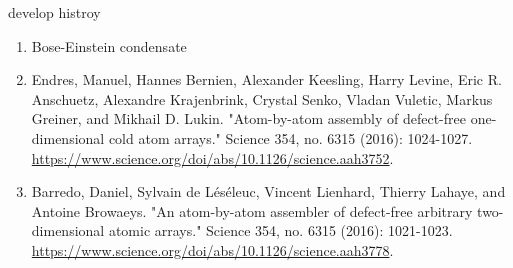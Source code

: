 \documentclass[18 pt]{beamer}
\begin{document}
\begin{frame}{develop histroy}
  \begin{enumerate}
    \item Bose-Einstein condensate
    \item \small{Endres, Manuel, Hannes Bernien, Alexander Keesling, Harry Levine, Eric R. Anschuetz, Alexandre Krajenbrink, Crystal Senko, Vladan Vuletic, Markus Greiner, and Mikhail D. Lukin. "Atom-by-atom assembly of defect-free one-dimensional cold atom arrays." Science 354, no. 6315 (2016): 1024-1027. \url{https://www.science.org/doi/abs/10.1126/science.aah3752}.}
    \item \small{Barredo, Daniel, Sylvain de Léséleuc, Vincent Lienhard, Thierry Lahaye, and Antoine Browaeys. "An atom-by-atom assembler of defect-free arbitrary two-dimensional atomic arrays." Science 354, no. 6315 (2016): 1021-1023. \url{https://www.science.org/doi/abs/10.1126/science.aah3778}.}
  \end{enumerate}
\end{frame}
\end{document}
